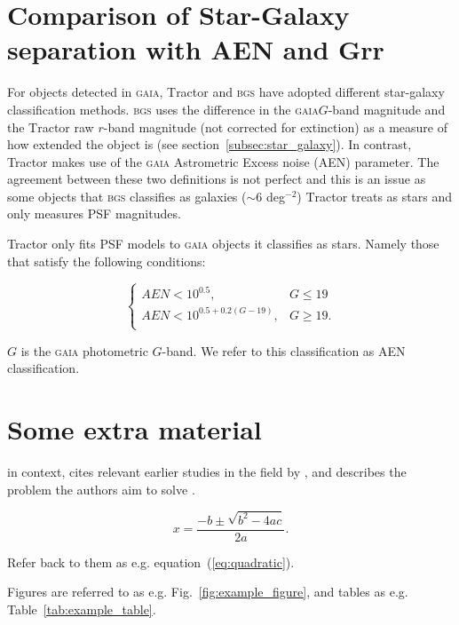 \documentclass[fleqn,usenatbib]{mnras}
\newcommand{\BGS}{\textsc{bgs}\xspace}
\newcommand{\GAIA}{\textsc{gaia}\xspace}
\newcommand{\TRACTOR}{\textsc{T}ractor\xspace}
\begin{document}
\begin{figure}
    \label{fig:flow_galaxy}
\end{figure}


\section{Comparison of Star-Galaxy separation with AEN and Grr}\label{app:sgmodels}

For objects detected in \GAIA, \TRACTOR and \BGS have adopted different star-galaxy classification methods. \BGS uses the difference in the \GAIA $G$-band magnitude and the \TRACTOR raw $r$-band magnitude (not corrected for extinction) as a measure of how extended the object is (see section~\ref{subsec:star_galaxy}). In contrast, Tractor makes use of the \GAIA Astrometric Excess noise (AEN) parameter. The agreement between these two definitions is not perfect and this is an issue as some objects that \BGS classifies as galaxies ($\sim 6$ deg$^{-2}$) \TRACTOR treats as stars and only measures PSF magnitudes.

Tractor only fits PSF models to \GAIA objects it classifies as stars. Namely those that satisfy the following conditions:

\begin{equation}
	\begin{cases}
      AEN < 10^{0.5}, & G \leq 19\\
      AEN < 10^{0.5 + 0.2(G - 19)}, & G \geq 19.\\
	\end{cases}
\end{equation}

$G$ is the \GAIA photometric $G$-band. We refer to this classification as AEN classification. 



\iffalse
\section{Some extra material}

in context, cites relevant earlier studies in the field by \citet{Others2013},
and describes the problem the authors aim to solve \citep[e.g.][]{Author2012}.

\begin{equation}
    x=\frac{-b\pm\sqrt{b^2-4ac}}{2a}.
	\label{eq:quadratic}
\end{equation}

Refer back to them as e.g. equation~(\ref{eq:quadratic}).

Figures are referred to as e.g. Fig.~\ref{fig:example_figure}, and tables as
e.g. Table~\ref{tab:example_table}.
\end{document}
